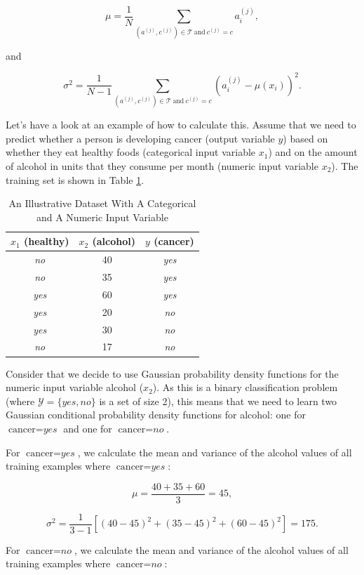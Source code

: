 \[ \mu = \frac{1}{N} \sum_{(a^{(j)},c^{(j)}) \in \mathcal{T} \ \text{and} \ c^{(j)} = c} a_i^{(j)}, \]

and

\[ \sigma^2 = \frac{1}{N - 1} \sum_{(a^{(j)},c^{(j)}) \in \mathcal{T} \ \text{and} \ c^{(j)} = c} (a_i^{(j)} - \mu(x_i))^2 .\]

Let's have a look at an example of how to calculate this. Assume that we need to predict whether a person is developing cancer (output variable $y$) based on whether they eat healthy foods (categorical input variable $x_1$) and on the amount of alcohol in units that they consume per month (numeric input variable $x_2$). The training set is shown in Table \ref{tab:dataset-2dim-numeric}.

\begin{table}[ht]
\centering
\caption{An Illustrative Dataset With A Categorical and A Numeric Input Variable} \label{tab:dataset-2dim-numeric}
\begin{tabular}{|c|c|c|} \hline
$x_1$ (healthy) & $x_2$ (alcohol) & $y$ (cancer) \\ \hline
\textit{no} & 40 & \textit{yes} \\
\textit{no} & 35 &  \textit{yes} \\
\textit{yes} & 60 &  \textit{yes} \\
\textit{yes} & 20 &  \textit{no} \\
\textit{yes} & 30 &  \textit{no} \\
\textit{no} & 17 &  \textit{no} \\ \hline
\end{tabular}
\end{table}

Consider that we decide to use Gaussian probability density functions for the numeric input variable alcohol ($x_2$). As this is a binary classification problem (where $\mathcal{Y} = \{\textit{yes},\textit{no}\}$ is a set of size 2), this means that we need to learn two Gaussian conditional probability density functions for alcohol: one for $\text{cancer}=\textit{yes}$ and one for $\text{cancer}=\textit{no}$.

For $\text{cancer} = \textit{yes}$, we calculate the mean and variance of the alcohol values of all training examples where $\text{cancer} = \textit{yes}$:

\[ \mu = \frac{40 + 35 + 60}{3} = 45,\]

\[ \sigma^2 = \frac{1}{3-1} [(40 - 45)^2+(35 - 45)^2+(60 - 45)^2] = 175.\]

For $\text{cancer} = \textit{no}$, we calculate the mean and variance of the alcohol values of all training examples where $\text{cancer} = \textit{no}$:

